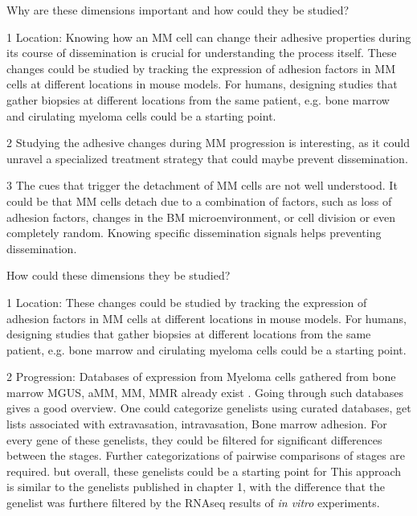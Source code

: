 



Why are these dimensions important and how could they be studied?

1 Location: Knowing how an MM cell can change their adhesive properties during its course of
dissemination is crucial for understanding the process itself. These changes
could be studied by tracking the expression of adhesion factors in MM cells at
different locations in mouse models. For humans, designing studies that gather
biopsies at different locations from the same patient, e.g. bone marrow and cirulating
myeloma cells could be a starting point.

2 Studying the adhesive changes during MM progression is
interesting, as it could unravel a specialized treatment strategy
that could maybe prevent dissemination.

3 The cues that trigger the detachment of MM cells are not well understood. It
could be that MM cells detach due to a combination of factors, such as loss of
adhesion factors, changes in the BM microenvironment, or cell division or
even completely random. Knowing specific dissemination signals helps preventing
dissemination.


How could these dimensions they be studied?

1 Location: These changes could be studied by tracking the expression of adhesion factors in MM cells at
different locations in mouse models. For humans, designing studies that gather
biopsies at different locations from the same patient, e.g. bone marrow and cirulating
myeloma cells could be a starting point.

2 Progression: Databases of expression from Myeloma cells gathered from bone
marrow \ac{MGUS}, \ac{aMM}, \ac{MM}, \ac{MMR} already exist
\citet{akhmetzyanovaDynamicCD138Surface2020,
      seckingerCD38ImmunotherapeuticTarget2018}. Going through such databases gives a
good overview. One could categorize genelists using curated databases, get lists
associated with extravasation, intravasation, Bone marrow adhesion. For every
gene of these genelists, they could be filtered for significant differences
between the stages. Further categorizations of pairwise comparisons of stages
are required. but overall, these genelists could be a starting point for This
approach is similar to the genelists published in chapter 1, with the difference
that the genelist was furthere filtered by the RNAseq results of \textit{in
      vitro} experiments.

